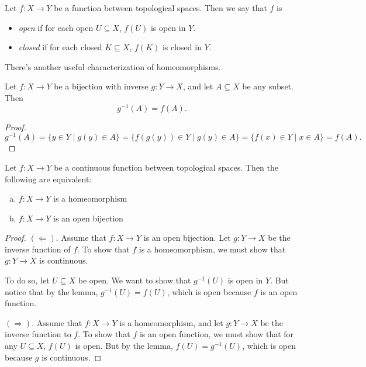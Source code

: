 \documentclass[noname]{notes}
\begin{document}
\begin{definition}
	Let $f \colon X \to Y$ be a function between topological spaces. Then we say that $f$ is 
	\begin{itemize}
		\item \emph{open} if for each open $U \subseteq X$, $f(U)$ is open in $Y$. 
		\item \emph{closed} if for each closed $K \subseteq X$, $f(K)$ is closed in $Y$.
	\end{itemize}
\end{definition}

There's another useful characterization of homeomorphisms. 

\begin{lemma}
	Let $f \colon X \to Y$ be a bijection with inverse $g \colon Y \to X$, and let $A \subseteq X$ be any subset. Then 
	\[
		g^{-1}(A) = f(A). 
	\]
\end{lemma}

\begin{proof}
	\[
		g^{-1}(A) = \{y \in Y \mid g(y) \in A\} 
			= \{f(g(y)) \in Y \mid g(y) \in A\} 
			= \{f(x) \in Y \mid x \in A\}
			= f(A).
	\]
\end{proof}

\begin{proposition}
	\label{homeomorphism is open bijection}
	Let $f \colon X \to Y$ be a continuous function between topological spaces. Then the following are equivalent: 
	\begin{enumerate}[(a)]
		\item $f \colon X \to Y$ is a homeomorphism
		\item $f \colon X \to Y$ is an open bijection
	\end{enumerate}
\end{proposition}

\begin{proof}
	$(\Longleftarrow)$. Assume that $f \colon X \to Y$ is an open bijection. Let $g \colon Y \to X$ be the inverse function of $f$. To show that $f$ is a homeomorphism, we must show that $g \colon Y \to X$ is continuous. 
	
	To do so, let $U \subseteq X$ be open. We want to show that $g^{-1}(U)$ is open in $Y$. But notice that by the lemma, $g^{-1}(U) = f(U)$, which is open because $f$ is an open function.
	
	$(\Longrightarrow)$. Assume that $f \colon X \to Y$ is a homeomorphism, and let $g \colon Y \to X$ be the inverse function to $f$. To show that $f$ is an open function, we must show that for any $U \subseteq X$, $f(U)$ is open. But by the lemma, $f(U) = g^{-1}(U)$, which is open because $g$ is continuous.
\end{proof}
\end{document}
